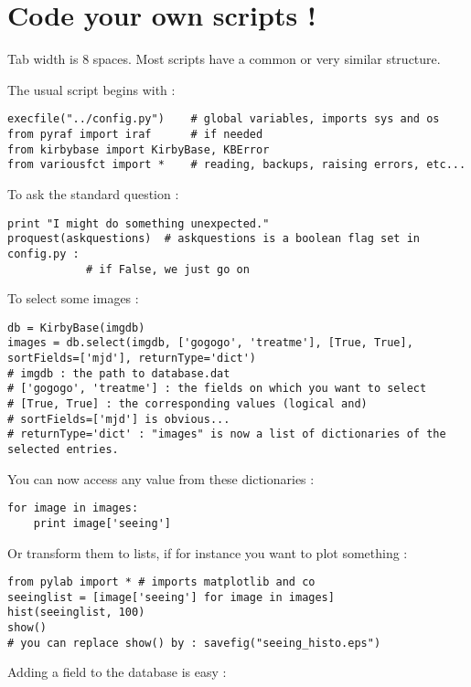 

\section{Code your own scripts !}

Tab width is 8 spaces. Most scripts have a common or very similar structure.

The usual script begins with :

\begin{lstlisting}
execfile("../config.py")	# global variables, imports sys and os
from pyraf import iraf		# if needed
from kirbybase import KirbyBase, KBError
from variousfct import *	# reading, backups, raising errors, etc...
\end{lstlisting}

To ask the standard question :

\begin{lstlisting}
print "I might do something unexpected."
proquest(askquestions)	# askquestions is a boolean flag set in config.py :
			# if False, we just go on
\end{lstlisting}


To select some images :

\begin{lstlisting}
db = KirbyBase(imgdb)
images = db.select(imgdb, ['gogogo', 'treatme'], [True, True], sortFields=['mjd'], returnType='dict')
# imgdb : the path to database.dat
# ['gogogo', 'treatme'] : the fields on which you want to select
# [True, True] : the corresponding values (logical and)
# sortFields=['mjd'] is obvious...
# returnType='dict' : "images" is now a list of dictionaries of the selected entries.
\end{lstlisting}

You can now access any value from these dictionaries :

\begin{lstlisting}
for image in images:
	print image['seeing']
\end{lstlisting}

Or transform them to lists, if for instance you want to plot something :

\begin{lstlisting}
from pylab import *	# imports matplotlib and co
seeinglist = [image['seeing'] for image in images]
hist(seeinglist, 100)
show()
# you can replace show() by : savefig("seeing_histo.eps")
\end{lstlisting}

Adding a field to the database is easy :

